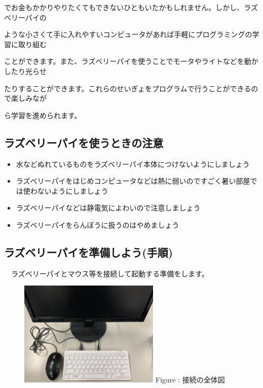 \documentclass[a4paper,12pt]{jarticle}
\begin{document}
でお金もかかりやりたくてもできないひともいたかもしれません。しかし、ラズベリーパイの

ような小さくて手に入れやすいコンピュータがあれば手軽にプログラミングの学習に取り組む

ことができます。また、ラズベリーパイを使うことでモータやライトなどを動かしたり光らせ

たりすることができます。これらのせいぎょをプログラムで行うことができるので楽しみなが

ら学習を進められます。

\subsection{ラズベリーパイを使うときの注意}
\begin{itemize}
  \item
        水などぬれているものをラズベリーパイ本体につけないようにしましょう
\end{itemize}
\begin{itemize}
  \item
        ラズベリーパイをはじめコンピュータなどは熱に弱いのですごく暑い部屋では使わないようにしましょう
\end{itemize}
\begin{itemize}
  \item
        ラズベリーパイなどは静電気によわいので注意しましょう
\end{itemize}
\begin{itemize}
  \item
        ラズベリーパイをらんぼうに扱うのはやめましょう
\end{itemize}


\clearpage

\subsection{ラズベリーパイを準備しよう(手順)}
\ \ ラズベリーパイとマウス等を接続して起動する準備をします。

\begin{figure}[ht]
  \centering
  \begin{minipage}{12.204cm}
    {\upshape
      \includegraphics[width=0.6\textwidth]{connections01-2023.jpg}
      \newline
      Figure : 接続の全体図}

  \end{minipage}
\end{figure}
\end{document}
